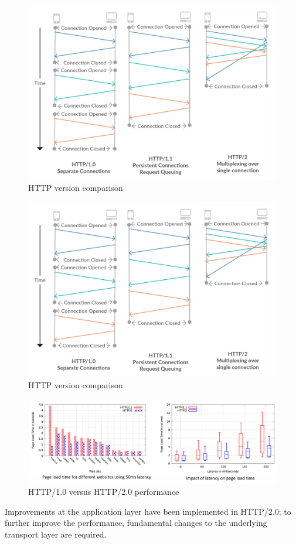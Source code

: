 \documentclass[a4paper,11pt]{article}
\begin{document}
\begin{figure}[H]
    \centering
    \includegraphics[width=\textwidth]{./images/httpversioncomparison.png}
    \caption{HTTP version comparison}
\end{figure}

\begin{figure}[H]
    \centering
    \includegraphics[width=\textwidth]{./images/httpversioncomparison.png}
    \caption{HTTP version comparison}
\end{figure}

\begin{figure}[H]
    \centering
    \includegraphics[width=\textwidth]{./images/http1vshttp2.png}
    \caption{HTTP/1.0 versus HTTP/2.0 performance}
\end{figure}

Improvements at the application layer have been implemented in HTTP/2.0;
to further improve the performance, fundamental changes to the underlying transport layer are required.
\end{document}
